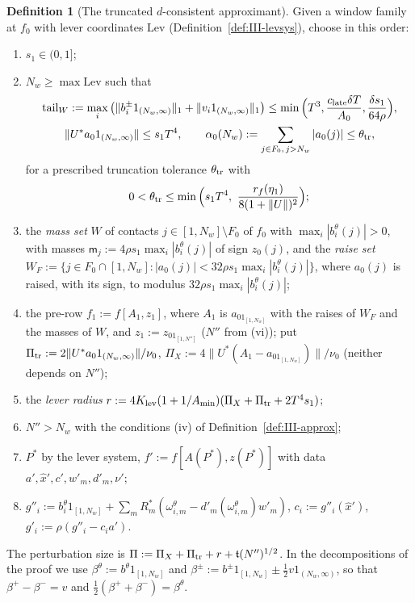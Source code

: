 \documentclass[10pt]{amsart}
\theoremstyle{definition}
\newtheorem{definition}[theorem]{Definition}
\theoremstyle{remark}
\begin{document}
\begin{definition}[The truncated $d$-consistent approximant]\label{def:III-approxinf}
Given a window family at $f_0$ with lever coordinates $\mathrm{Lev}$
(Definition~\ref{def:III-levsys}), choose in this order:
\begin{enumerate}
\item[(i)] $s_1\in(0,1]$;
\item[(ii)] $N_w\ge\max\mathrm{Lev}$ such that
\begin{gather*}
 \mathrm{tail}_W:=\max_i\big(\|b^\pm_i1_{(N_w,\infty)}\|_1+\|v_i1_{(N_w,\infty)}
 \|_1\big)\le\min\Big(T^3,\frac{c_{\rm late}\delta T}{A_0},\frac{\delta s_1}
 {64\rho}\Big),\\
 \|U^*a_01_{(N_w,\infty)}\|\le s_1T^4,\qquad \alpha_0(N_w):=\sum_{j\in F_0,\,
 j>N_w}|a_0(j)|\le\theta_{\rm tr},
\end{gather*}
for a prescribed truncation tolerance $\theta_{\rm tr}$ with
\[
 0<\theta_{\rm tr}\le\min\Big(s_1T^4,\ \frac{r_f(\eta_1)}{8(1+\|U\|)^2}\Big);
\]
\item[(iii)] the \emph{mass set} $W$ of contacts $j\in[1,N_w]\setminus F_0$
of $f_0$ with $\max_i|b^\theta_i(j)|>0$, with masses $\mathsf m_j:=4\rho s_1
\max_i|b^\theta_i(j)|$ of sign $z_0(j)$, and the \emph{raise set}
$W_F:=\{j\in F_0\cap[1,N_w]:|a_0(j)|<32\rho s_1\max_i|b^\theta_i(j)|\}$, where
$a_0(j)$ is raised, with its sign, to modulus $32\rho s_1\max_i|b^\theta_i(j)|$;
\item[(iv)] the pre-row $f_1:=f[A_1,z_1]$, where $A_1$ is $a_01_{[1,N_w]}$ with
the raises of $W_F$ and the masses of $W$, and $z_1:=z_01_{[1,N'']}$ ($N''$
from (vi)); put $\Pi_{\rm tr}:=2\|U^*a_01_{(N_w,\infty)}\|/\nu_0$,
$\Pi_X:=4\|U^*(A_1-a_01_{[1,N_w]})\|/\nu_0$ (neither depends on $N''$);
\item[(v)] the \emph{lever radius} $r:=4K_{\rm lev}(1+1/A_{\min})(\Pi_X+
\Pi_{\rm tr}+2T^4s_1)$;
\item[(vi)] $N''>N_w$ with the conditions (iv) of
Definition~\ref{def:III-approx};
\item[(vii)] $P^*$ by the lever system, $f':=f[A(P^*),z(P^*)]$ with data
$a',\hat x',c',w'_m,d'_m,\nu'$;
\item[(viii)] $g''_i:=b^\theta_i1_{[1,N_w]}+\sum_mR_m^*(\omega^\theta_{i,m}-
d'_m(\omega^\theta_{i,m})w'_m)$, $c_i:=g''_i(\hat x')$, $g'_i:=\rho(g''_i-c_ia')$.
\end{enumerate}
The perturbation size is $\Pi:=\Pi_X+\Pi_{\rm tr}+r+\mathfrak t(N'')^{1/2}$.
In the decompositions of the proof we use $\beta^\theta:=b^\theta1_{[1,N_w]}$
and $\beta^\pm:=b^\pm1_{[1,N_w]}\pm\frac12v1_{(N_w,\infty)}$, so that
$\beta^+-\beta^-=v$ and $\frac12(\beta^++\beta^-)=\beta^\theta$.
\end{definition}
\end{document}
